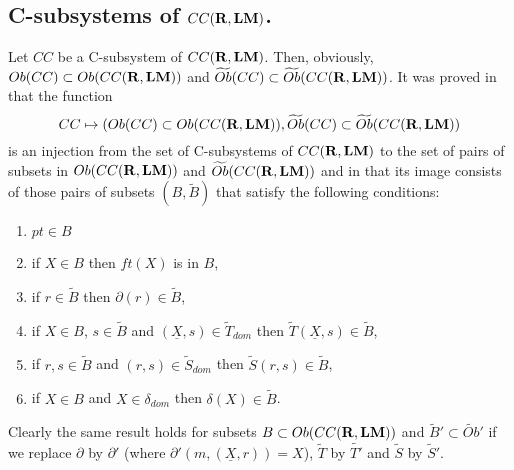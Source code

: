 \documentclass[11pt]{article}
\newcommand{\rr}{{\bf R}}
\newcommand{\lm}{{\bf LM}}
\newcommand{\uu}{\underline}
\newcommand{\wt}{\widetilde}
\begin{document}
%









\subsection{C-subsystems of $CC(\rr,\lm)$.}
%

Let $CC$ be a C-subsystem of $CC(\rr,\lm)$.  Then, obviously, $Ob(CC)\subset Ob(CC(\rr,\lm))$ and $\wt{Ob}(CC)\subset \wt{Ob}(CC(\rr,\lm))$. It was proved in \cite[Lemma 4.1]{Csubsystems} that the function 
%
$$CC\mapsto (Ob(CC)\subset Ob(CC(\rr,\lm)),\wt{Ob}(CC)\subset \wt{Ob}(CC(\rr,\lm))$$
%
is an injection from the set of C-subsystems of $CC(\rr,\lm)$ to the set of pairs of subsets in $Ob(CC(\rr,\lm))$ and $\wt{Ob}(CC(\rr,\lm))$ and in \cite[Proposition 4.3]{Csubsystems} that its image consists of those pairs of subsets $(B,\wt{B})$ that satisfy the following conditions:
%
\begin{enumerate}
\item $pt\in B$
\item if $X\in B$ then $ft(X)$ is in $B$,
\item if $r\in \wt{B}$ then $\partial(r)\in \wt{B}$,
\item if $X\in B$, $s\in \wt{B}$ and $(\uu{X},s)\in \wt{T}_{dom}$ then $\wt{T}(\uu{X},s)\in \wt{B}$,
\item if $r,s\in \wt{B}$ and $(r,s)\in \wt{S}_{dom}$ then $\wt{S}(r,s)\in \wt{B}$,
\item if $X\in B$ and $X\in \delta_{dom}$ then $\delta(X)\in \wt{B}$.
\end{enumerate}
%
Clearly the same result holds for subsets $B\subset Ob(CC(\rr,\lm))$ and $\wt{B}'\subset \wt{Ob}'$ if we replace $\partial$ by $\partial'$ (where $\partial'(m,(\uu{X},r))=X$),  $\wt{T}$ by $\wt{T'}$ and $\wt{S}$ by $\wt{S}'$.
\end{document}
